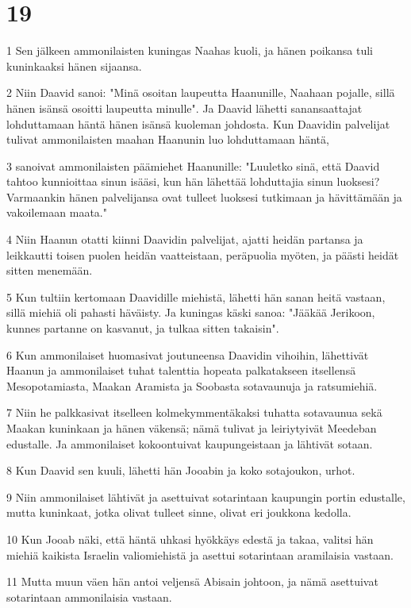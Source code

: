 \chapter{19}

\par 1 Sen jälkeen ammonilaisten kuningas Naahas kuoli, ja hänen poikansa tuli kuninkaaksi hänen sijaansa.
\par 2 Niin Daavid sanoi: "Minä osoitan laupeutta Haanunille, Naahaan pojalle, sillä hänen isänsä osoitti laupeutta minulle". Ja Daavid lähetti sanansaattajat lohduttamaan häntä hänen isänsä kuoleman johdosta. Kun Daavidin palvelijat tulivat ammonilaisten maahan Haanunin luo lohduttamaan häntä,
\par 3 sanoivat ammonilaisten päämiehet Haanunille: "Luuletko sinä, että Daavid tahtoo kunnioittaa sinun isääsi, kun hän lähettää lohduttajia sinun luoksesi? Varmaankin hänen palvelijansa ovat tulleet luoksesi tutkimaan ja hävittämään ja vakoilemaan maata."
\par 4 Niin Haanun otatti kiinni Daavidin palvelijat, ajatti heidän partansa ja leikkautti toisen puolen heidän vaatteistaan, peräpuolia myöten, ja päästi heidät sitten menemään.
\par 5 Kun tultiin kertomaan Daavidille miehistä, lähetti hän sanan heitä vastaan, sillä miehiä oli pahasti häväisty. Ja kuningas käski sanoa: "Jääkää Jerikoon, kunnes partanne on kasvanut, ja tulkaa sitten takaisin".
\par 6 Kun ammonilaiset huomasivat joutuneensa Daavidin vihoihin, lähettivät Haanun ja ammonilaiset tuhat talenttia hopeata palkatakseen itsellensä Mesopotamiasta, Maakan Aramista ja Soobasta sotavaunuja ja ratsumiehiä.
\par 7 Niin he palkkasivat itselleen kolmekymmentäkaksi tuhatta sotavaunua sekä Maakan kuninkaan ja hänen väkensä; nämä tulivat ja leiriytyivät Meedeban edustalle. Ja ammonilaiset kokoontuivat kaupungeistaan ja lähtivät sotaan.
\par 8 Kun Daavid sen kuuli, lähetti hän Jooabin ja koko sotajoukon, urhot.
\par 9 Niin ammonilaiset lähtivät ja asettuivat sotarintaan kaupungin portin edustalle, mutta kuninkaat, jotka olivat tulleet sinne, olivat eri joukkona kedolla.
\par 10 Kun Jooab näki, että häntä uhkasi hyökkäys edestä ja takaa, valitsi hän miehiä kaikista Israelin valiomiehistä ja asettui sotarintaan aramilaisia vastaan.
\par 11 Mutta muun väen hän antoi veljensä Abisain johtoon, ja nämä asettuivat sotarintaan ammonilaisia vastaan.
